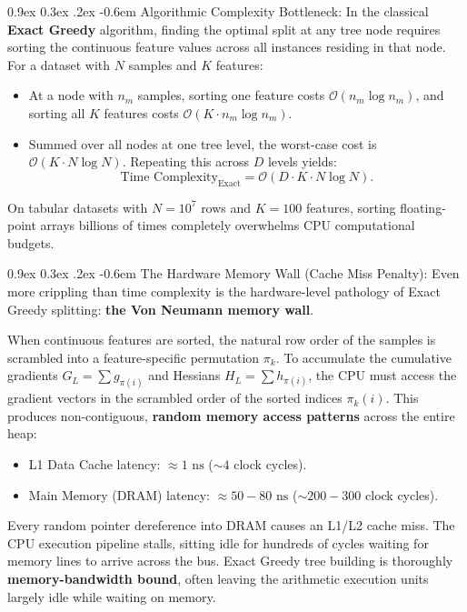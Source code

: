 \documentclass[11pt,a4paper]{article}
\makeatletter
\renewcommand\paragraph{\@startsection{paragraph}{4}{\z@}%
                                     {0.9ex \@plus0.3ex \@minus.2ex}%
                                     {-0.6em}%
                                     {\normalfont\normalsize\bfseries}}
\makeatother
\begin{document}
\paragraph{Algorithmic Complexity Bottleneck:}
In the classical \textbf{Exact Greedy} algorithm, finding the optimal split at any tree node requires sorting the continuous feature values across all instances residing in that node. For a dataset with $N$ samples and $K$ features:
\begin{itemize}
    \item At a node with $n_m$ samples, sorting one feature costs $\mathcal{O}(n_m \log n_m)$, and sorting all $K$ features costs $\mathcal{O}(K \cdot n_m \log n_m)$.
    \item Summed over all nodes at one tree level, the worst-case cost is $\mathcal{O}(K \cdot N \log N)$. Repeating this across $D$ levels yields:
    \begin{equation}
        \text{Time Complexity}_{\text{Exact}} = \mathcal{O}(D \cdot K \cdot N \log N).
    \end{equation}
\end{itemize}
On tabular datasets with $N = 10^7$ rows and $K = 100$ features, sorting floating-point arrays billions of times completely overwhelms CPU computational budgets.

\paragraph{The Hardware Memory Wall (Cache Miss Penalty):}
Even more crippling than time complexity is the hardware-level pathology of Exact Greedy splitting: \textbf{the Von Neumann memory wall}.

When continuous features are sorted, the natural row order of the samples is scrambled into a feature-specific permutation $\pi_k$. To accumulate the cumulative gradients $G_L = \sum g_{\pi(i)}$ and Hessians $H_L = \sum h_{\pi(i)}$, the CPU must access the gradient vectors in the scrambled order of the sorted indices $\pi_k(i)$. This produces non-contiguous, \textbf{random memory access patterns} across the entire heap:
\begin{itemize}
    \item L1 Data Cache latency: $\approx 1 \text{ ns}$ ($\sim 4$ clock cycles).
    \item Main Memory (DRAM) latency: $\approx 50 - 80 \text{ ns}$ ($\sim 200 - 300$ clock cycles).
\end{itemize}
Every random pointer dereference into DRAM causes an L1/L2 cache miss. The CPU execution pipeline stalls, sitting idle for hundreds of cycles waiting for memory lines to arrive across the bus. Exact Greedy tree building is thoroughly \textbf{memory-bandwidth bound}, often leaving the arithmetic execution units largely idle while waiting on memory.
\end{document}
